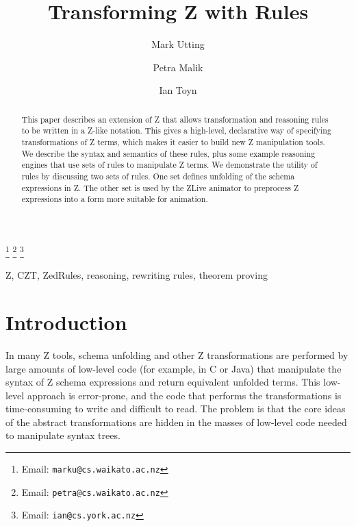 \documentclass{entcs}
\begin{document}
\begin{frontmatter}
  \title{Transforming Z with Rules}
  \author{Mark Utting}
  \address{Department of Computer Science\\
    The University of Waikato\\
    Hamilton, New Zealand} 
  \author{Petra Malik}
  \address{Department of Computer Science\\
    The University of Waikato\\
    Hamilton, New Zealand} 
  \author{Ian Toyn}
  \address{Department of Computer Science\\
    The University of York\\
    Heslington, York, UK}
  \thanks[emailMark]{Email: \texttt{marku@cs.waikato.ac.nz}}
  \thanks[emailPetra]{Email: \texttt{petra@cs.waikato.ac.nz}}
  \thanks[emailIan]{Email: \texttt{ian@cs.york.ac.nz}}
\begin{abstract}
  This paper describes an extension of Z that allows transformation
  and reasoning rules to be written in a Z-like notation.  This gives
  a high-level, declarative way of specifying transformations of Z
  terms, which makes it easier to build new Z manipulation tools.  We
  describe the syntax and semantics of these rules, plus some example
  reasoning engines that use sets of rules to manipulate Z terms.  We
  demonstrate the utility of rules by discussing two sets of rules.
  One set defines unfolding of the schema expressions in Z.  The other
  set is used by the ZLive animator to preprocess Z expressions into a
  form more suitable for animation.
\end{abstract}
\begin{keyword}
  Z, CZT, ZedRules, reasoning, rewriting rules, theorem proving
\end{keyword}
\end{frontmatter}



\section{Introduction}

In many Z tools, schema unfolding and other Z transformations are performed
by large amounts of low-level code (for example, in C or Java) that
manipulate the syntax of Z schema expressions and return equivalent
unfolded terms.  This low-level approach is error-prone, and the code that
performs the transformations is time-consuming to write and difficult to
read.  The problem is that the core ideas of the abstract transformations are
hidden in the masses of low-level code needed to manipulate syntax trees.
\end{document}
